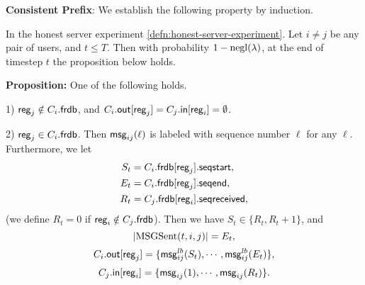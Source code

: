 \textbf{Consistent Prefix}: We establish the following property by induction.
\begin{lemma}
\label{lem:correctness-main}
In the honest server experiment \cref{defn:honest-server-experiment}. Let $i \neq j$ be any pair of users, and $t \leq T$. Then with probability $1 - \operatorname{negl}(\lambda)$, at the end of timestep $t$ the proposition below holds.

\textbf{Proposition: }One of the following holds.

1) $\mathsf{reg}_j \notin C_i.\mathsf{frdb}$, and $C_i.\mathsf{out}[\mathsf{reg}_j] = C_j.\mathsf{in}[\mathsf{reg}_i] = \emptyset$.

2) $\mathsf{reg}_j \in C_i.\mathsf{frdb}$. Then $\mathsf{msg}_{ij}(\ell)$ is labeled with sequence number $\ell$ for any $\ell$. Furthermore, we let
\begin{align*}
S_t &= C_i.\mathsf{frdb}[\mathsf{reg}_j].\mathsf{seqstart}, \\
E_t &= C_i.\mathsf{frdb}[\mathsf{reg}_j].\mathsf{seqend}, \\
R_t &= C_j.\mathsf{frdb}[\mathsf{reg}_i].\mathsf{seqreceived},
\end{align*}
(we define $R_t = 0$ if $\mathsf{reg}_i \notin C_j.\mathsf{frdb}$). Then we have $S_t \in \{R_t, R_t + 1\}$, and
$$\left| \text{MSGSent}(t, i, j) \right| = E_t,$$
$$C_i.\mathsf{out}[\mathsf{reg}_j] = \{\mathsf{msg}^{lb}_{ij}(S_t), \cdots, \mathsf{msg}^{lb}_{ij}(E_t)\},$$
$$C_j.\mathsf{in}[\mathsf{reg}_i] = \{\mathsf{msg}_{ij}(1), \cdots, \mathsf{msg}_{ij}(R_t)\}.$$
\end{lemma}
